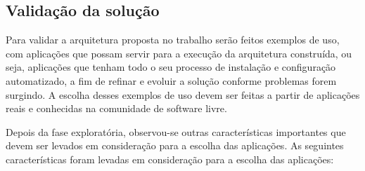 \subsection{Validação da solução}
\label{subsection:validacao}

Para validar a arquitetura proposta no trabalho serão feitos exemplos de uso,
com aplicações que possam servir para a execução da arquitetura construída, ou seja,
aplicações que tenham todo o seu processo de instalação e configuração automatizado, a
fim de refinar e evoluir a solução conforme problemas forem surgindo. A escolha
desses exemplos de uso devem ser feitas a partir de aplicações reais e
conhecidas na comunidade de software livre. 

Depois da fase exploratória, observou-se outras características importantes que 
devem ser levados em consideração para a escolha das aplicações. As seguintes 
características foram levadas em consideração para a escolha das aplicações:

